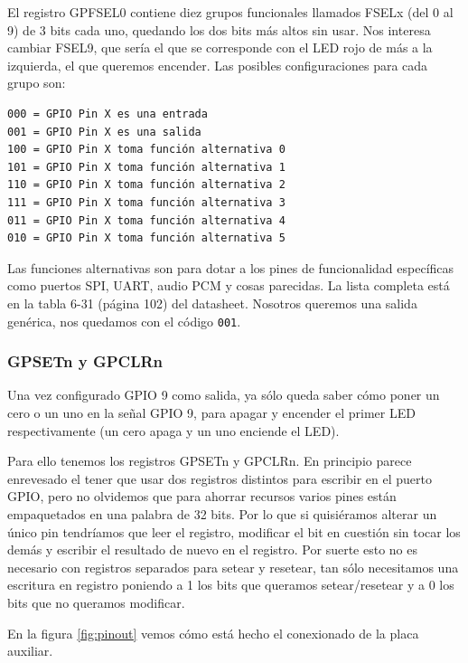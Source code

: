 El registro GPFSEL0 contiene diez grupos funcionales
llamados FSELx (del 0 al 9) de 3 bits cada uno, quedando los dos bits
más altos sin usar. Nos interesa cambiar FSEL9, que sería el que se corresponde
con el LED rojo de más a la izquierda, el que queremos encender. Las posibles
configuraciones para cada grupo son:

\begin{lstlisting}
000 = GPIO Pin X es una entrada
001 = GPIO Pin X es una salida
100 = GPIO Pin X toma función alternativa 0
101 = GPIO Pin X toma función alternativa 1
110 = GPIO Pin X toma función alternativa 2
111 = GPIO Pin X toma función alternativa 3
011 = GPIO Pin X toma función alternativa 4
010 = GPIO Pin X toma función alternativa 5
\end{lstlisting}

Las funciones alternativas son para dotar a los pines de funcionalidad específicas
como puertos SPI, UART, audio PCM y cosas parecidas. La lista completa
está en la tabla 6-31 (página 102) del datasheet. Nosotros queremos una salida
genérica, nos quedamos con el código {\tt 001}.


\subsubsection{GPSETn y GPCLRn}

Una vez configurado GPIO 9 como salida, ya sólo queda saber cómo poner un cero o un
uno en la señal GPIO 9, para apagar y encender el primer LED respectivamente (un cero apaga
y un uno enciende el LED).

Para ello tenemos los registros GPSETn y GPCLRn. En principio parece enrevesado el tener
que usar dos registros distintos para escribir en el puerto GPIO, pero no olvidemos que
para ahorrar recursos varios pines están empaquetados en una palabra de 32 bits. Por lo
que si quisiéramos alterar un único pin tendríamos que leer el registro, modificar el bit
en cuestión sin tocar los demás y escribir el resultado de nuevo en el registro. Por suerte
esto no es necesario con registros separados para setear y resetear, tan sólo necesitamos
una escritura en registro poniendo a 1 los bits que queramos setear/resetear y a 0 los bits
que no queramos modificar.

En la figura \ref{fig:pinout} vemos cómo está hecho el conexionado de la placa auxiliar.

